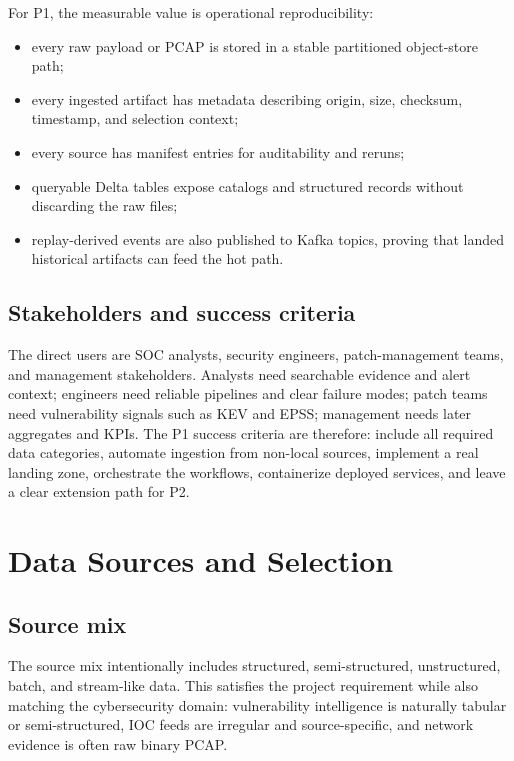 \documentclass[11pt,a4paper]{article}
\begin{document}
For P1, the measurable value is operational reproducibility:
\begin{itemize}
  \item every raw payload or PCAP is stored in a stable partitioned object-store path;
  \item every ingested artifact has metadata describing origin, size, checksum, timestamp, and selection context;
  \item every source has manifest entries for auditability and reruns;
  \item queryable Delta tables expose catalogs and structured records without discarding the raw files;
  \item replay-derived events are also published to Kafka topics, proving that landed historical artifacts can feed the hot path.
\end{itemize}

\subsection{Stakeholders and success criteria}
The direct users are SOC analysts, security engineers, patch-management teams, and management stakeholders. Analysts need searchable evidence and alert context; engineers need reliable pipelines and clear failure modes; patch teams need vulnerability signals such as KEV and EPSS; management needs later aggregates and KPIs. The P1 success criteria are therefore: include all required data categories, automate ingestion from non-local sources, implement a real landing zone, orchestrate the workflows, containerize deployed services, and leave a clear extension path for P2.

\section{Data Sources and Selection}

\subsection{Source mix}
The source mix intentionally includes structured, semi-structured, unstructured, batch, and stream-like data. This satisfies the project requirement while also matching the cybersecurity domain: vulnerability intelligence is naturally tabular or semi-structured, IOC feeds are irregular and source-specific, and network evidence is often raw binary PCAP.
\end{document}
